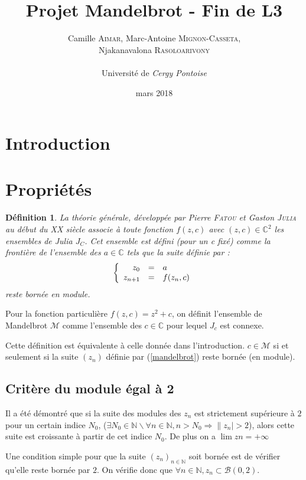 \documentclass[12pt,a4paper]{report}
\title{Projet Mandelbrot - Fin de L3}
\author{Camille \textsc{Aimar}, Marc-Antoine \textsc{Mignon-Casseta},\\Njakanavalona \textsc{Rasoloarivony} \\ \\ Université de\emph{ Cergy Pontoise}}
\date{mars 2018}
\theoremstyle{plain}
\newtheorem{definition}{Définition}
\begin{document}
\maketitle
\setcounter{chapter}{1}
\section{Introduction}

\newpage
\section{Propriétés}
	\begin{definition}
La théorie générale, développée par Pierre \textsc{Fatou} et Gaston \textsc{Julia} au début du \textsc{XX}\ieme {} siècle associe à toute fonction $f(z,c)$ avec $(z,c) \in \mathbb{C}^2$ les ensembles de Julia $J_C$. Cet ensemble est défini (pour un c fixé) comme la frontière de l'ensemble des $a \in \mathbb{C}$ tels que la suite définie par :
\begin{equation}\label{julia}
\left\{
\begin{array}{r c l}
z_0 &=& a\\
z_{n+1} &=& f(z_n, c)
\end{array}
\right.
\end{equation}
reste bornée en module.
\end{definition}

Pour la fonction particulière $f(z,c)=z^2+c$, on définit l'ensemble de Mandelbrot $\mathcal{M}$ comme l'ensemble des $c \in \mathbb{C}$ pour lequel $J_c$ est connexe.

Cette définition est équivalente à celle donnée dans l'introduction. $c \in \mathcal{M}$ si et seulement si la suite $(z_n)$ définie par (\ref{mandelbrot}) reste bornée (en module).

	\subsection{Critère du module égal à 2}
Il a été démontré que si la suite des modules des $z_n$ est strictement supérieure à $2$ pour un certain indice $N_0$,
($\exists N_0 \in \mathbb{N} \backslash \forall n \in \mathbb{N},{} n>N_0 \Longrightarrow \|z_n|>2$), alors cette suite est croissante à partir de cet indice $N_0$. De plus on a $\lim zn = +\infty$

Une condition simple pour que la suite $(z_n)_{n \in \mathbb{N}}$ soit bornée est de vérifier qu'elle reste bornée par $2$. On vérifie donc que $\forall n \in \mathbb{N}, z_n \subset \mathcal{B}(0,2)$.
\end{document}
